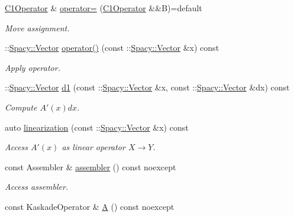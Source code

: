 \begin{DoxyCompactItemize}
\hyperlink{classSpacy_1_1Kaskade_1_1C1Operator}{C1\+Operator} \& \hyperlink{classSpacy_1_1Kaskade_1_1C1Operator_ab05b1e6565daf571d60ecf1b4584c991_ab05b1e6565daf571d60ecf1b4584c991}{operator=} (\hyperlink{classSpacy_1_1Kaskade_1_1C1Operator}{C1\+Operator} \&\&B)=default
\begin{DoxyCompactList}\small\item\em Move assignment. \end{DoxyCompactList}\item 
\+::\hyperlink{classSpacy_1_1Vector}{Spacy\+::\+Vector} \hyperlink{classSpacy_1_1Kaskade_1_1C1Operator_aae23a007cd7a66f90bbb1c93da34735d_aae23a007cd7a66f90bbb1c93da34735d}{operator()} (const \+::\hyperlink{classSpacy_1_1Vector}{Spacy\+::\+Vector} \&x) const 
\begin{DoxyCompactList}\small\item\em Apply operator. \end{DoxyCompactList}\item 
\+::\hyperlink{classSpacy_1_1Vector}{Spacy\+::\+Vector} \hyperlink{classSpacy_1_1Kaskade_1_1C1Operator_a32cfd05c372cc4bc8d7e0e8aedc1e8b9_a32cfd05c372cc4bc8d7e0e8aedc1e8b9}{d1} (const \+::\hyperlink{classSpacy_1_1Vector}{Spacy\+::\+Vector} \&x, const \+::\hyperlink{classSpacy_1_1Vector}{Spacy\+::\+Vector} \&dx) const 
\begin{DoxyCompactList}\small\item\em Compute $A'(x)dx$. \end{DoxyCompactList}\item 
auto \hyperlink{classSpacy_1_1Kaskade_1_1C1Operator_afb9837bb1c40e00b53e7430c745b1931_afb9837bb1c40e00b53e7430c745b1931}{linearization} (const \+::\hyperlink{classSpacy_1_1Vector}{Spacy\+::\+Vector} \&x) const 
\begin{DoxyCompactList}\small\item\em Access $A'(x)$ as linear operator $X\rightarrow Y$. \end{DoxyCompactList}\item 
const Assembler \& \hyperlink{classSpacy_1_1Kaskade_1_1C1Operator_abd45d2fe429b199daf4f6462bdf4cb59_abd45d2fe429b199daf4f6462bdf4cb59}{assembler} () const noexcept
\begin{DoxyCompactList}\small\item\em Access assembler. \end{DoxyCompactList}\item 
\hypertarget{classSpacy_1_1Kaskade_1_1C1Operator_ab050915a62f3f8bf25e78af1e1289cb8}{}const Kaskade\+Operator \& \hyperlink{classSpacy_1_1Kaskade_1_1C1Operator_ab050915a62f3f8bf25e78af1e1289cb8}{A} () const noexcept\label{classSpacy_1_1Kaskade_1_1C1Operator_ab050915a62f3f8bf25e78af1e1289cb8}


\end{DoxyCompactItemize}
